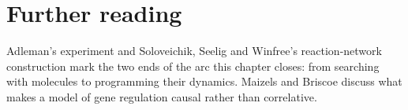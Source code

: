 \section*{Further reading}
Adleman's experiment\cite{Adleman1994} and Soloveichik, Seelig and Winfree's
reaction-network construction\cite{Soloveichik2010} mark the two ends of the
arc this chapter closes: from searching with molecules to programming their
dynamics. Maizels and Briscoe discuss what makes a model of gene regulation
causal rather than correlative.\cite{MaizelsBriscoe2026}
